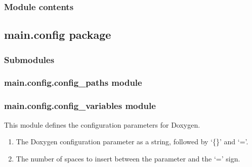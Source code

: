 \documentclass[letterpaper,10pt,english]{sphinxmanual}
\begin{document}
\subsubsection{Module contents}
\label{\detokenize{main.ai_language_model:module-main.ai_language_model}}\label{\detokenize{main.ai_language_model:module-contents}}
\sphinxstepscope


\subsection{main.config package}
\label{\detokenize{main.config:main-config-package}}\label{\detokenize{main.config::doc}}

\subsubsection{Submodules}
\label{\detokenize{main.config:submodules}}

\subsubsection{main.config.config\_paths module}
\label{\detokenize{main.config:module-main.config.config_paths}}\label{\detokenize{main.config:main-config-config-paths-module}}

\subsubsection{main.config.config\_variables module}
\label{\detokenize{main.config:module-main.config.config_variables}}\label{\detokenize{main.config:main-config-config-variables-module}}
\sphinxAtStartPar
This module defines the configuration parameters for Doxygen.
\begin{description}
\begin{enumerate}
%
\item {} 
\sphinxAtStartPar
The Doxygen configuration parameter as a string, followed by ‘\{\}’ and ‘=’.

\item {} 
\sphinxAtStartPar
The number of spaces to insert between the parameter and the ‘=’ sign.

\end{enumerate}

\end{description}
\end{document}
